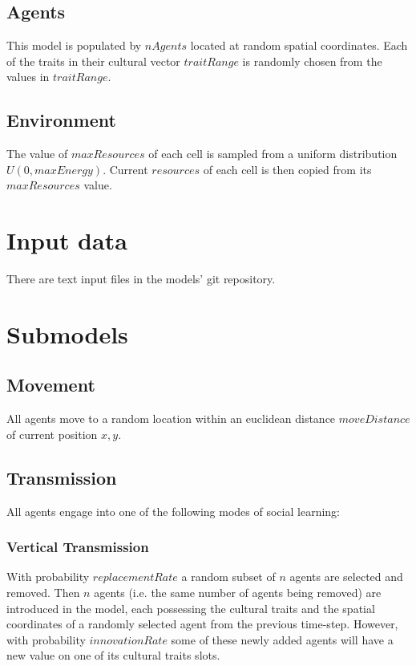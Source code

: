 \documentclass[11pt,a4paper,twocolumn,notitlepage]{article}
\begin{document}
\subsection{Agents}

This model is populated by $nAgents$ located at random spatial coordinates. Each of the traits in their cultural vector $traitRange$ is randomly chosen from the values in $traitRange$.

\subsection{Environment}

The value of $maxResources$ of each cell is sampled from a uniform distribution $U(0,maxEnergy)$. Current $resources$ of each cell is then copied from its $maxResources$ value.

\section{Input data}

There are text input files in the models' git repository. 

\section{Submodels}

\subsection{Movement}

All agents move to a random location within an euclidean distance $moveDistance$ of current position $x,y$.

\subsection{Transmission}
All agents engage into one of the following modes of social learning:

\subsubsection{Vertical Transmission}

With probability $replacementRate$ a random subset of $n$ agents are selected and removed. Then $n$ agents (i.e. the same number of agents being removed) are introduced in the model, each possessing the cultural traits and the spatial coordinates of a randomly selected agent from the previous time-step. However, with probability $innovationRate$ some of these newly added agents will have a new value on one of its cultural traits slots.
\end{document}
